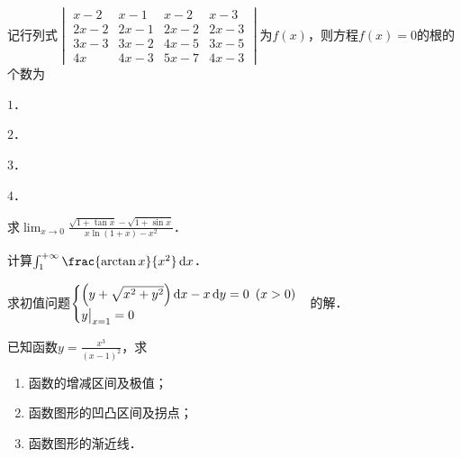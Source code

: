 \documentclass[plain,noanswer,medmath]{../../template/jnuexam}
\begin{document}
\begin{problem}
记行列式$\begin{vmatrix}
   x - 2 &  x - 1 &  x - 2 & x - 3 \\
  2x - 2 & 2x - 1 & 2x - 2 & 2x - 3 \\
  3x - 3 & 3x - 2 & 4x - 5 & 3x - 5 \\
      4x & 4x - 3 & 5x - 7 & 4x - 3
\end{vmatrix}$为$f(x)$，则方程$f(x) = 0$的根的个数为\pickout{}
\begin{abcd}
\item $1$．
\item $2$．
\item $3$．
\item $4$．
\end{abcd}
\end{problem}



\begin{problem}
求$\lim_{x \to 0} \frac{\sqrt{1 + \tan x} - \sqrt{1 + \sin x}}{x\ln \left(1 + x \right) - x^2}$．
\end{problem}



\begin{problem}
计算$\int_1^{+\infty} \frac{\arctan x}{x^2}\dx$．
\end{problem}



\begin{problem}
求初值问题$\begin{cases}
  \left(y + \sqrt{x^2 + y^2} \right)\mathop{}\!\mathrm{d} x - x\mathop{}\!\mathrm{d} y = 0\enspace(x > 0) \\
  y\big|_{x = 1} = 0 \\
\end{cases}$的解．
\end{problem}






\begin{problem}
已知函数$y = \frac{x^3}{(x - 1)^2}$，求
\begin{enumerate}
\item 函数的增减区间及极值；
\item 函数图形的凹凸区间及拐点；
\item 函数图形的渐近线．
\end{enumerate}
\end{problem}
\end{document}
